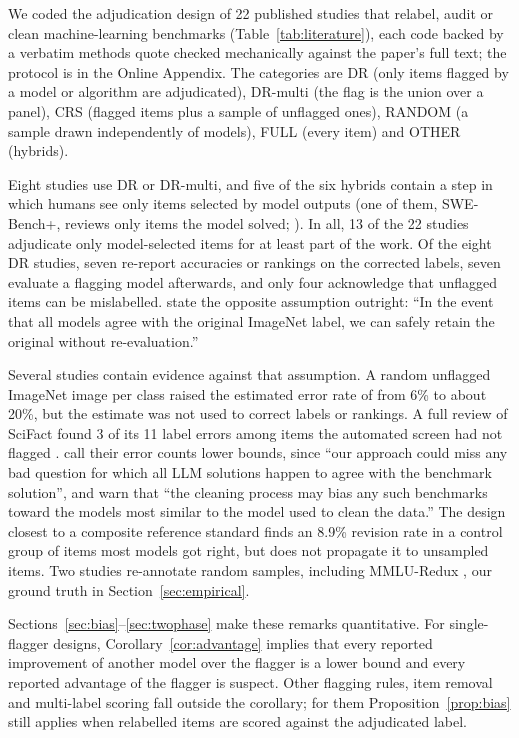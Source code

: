We coded the adjudication design of 22 published studies that relabel, audit or clean machine-learning benchmarks (Table~\ref{tab:literature}), each code backed by a verbatim methods quote checked mechanically against the paper's full text; the protocol is in the Online Appendix. The categories are DR (only items flagged by a model or algorithm are adjudicated), DR-multi (the flag is the union over a panel), CRS (flagged items plus a sample of unflagged ones), RANDOM (a sample drawn independently of models), FULL (every item) and OTHER (hybrids).

Eight studies use DR or DR-multi, and five of the six hybrids contain a step in which humans see only items selected by model outputs (one of them, SWE-Bench+, reviews only items the model solved; \citealp{aleithan2024swebench}). In all, 13 of the 22 studies adjudicate only model-selected items for at least part of the work. Of the eight DR studies, seven re-report accuracies or rankings on the corrected labels, seven evaluate a flagging model afterwards, and only four acknowledge that unflagged items can be mislabelled. \citet[p.~4]{beyer2020are} state the opposite assumption outright: ``In the event that all models agree with the original ImageNet label, we can safely retain the original without re-evaluation.''

Several studies contain evidence against that assumption. A random unflagged ImageNet image per class raised the estimated error rate of \citet{northcutt2021pervasive} from 6\% to about 20\%, but the estimate was not used to correct labels or rankings. A full review of SciFact found 3 of its 11 label errors among items the automated screen had not flagged \citep{sylvestre2026gold}. \citet{vendrow2025do} call their error counts lower bounds, since ``our approach could miss any bad question for which all LLM solutions happen to agree with the benchmark solution'', and \citet{chong2022detecting} warn that ``the cleaning process may bias any such benchmarks toward the models most similar to the model used to clean the data.'' The design closest to a composite reference standard \citep{alt2020tacred} finds an 8.9\% revision rate in a control group of items most models got right, but does not propagate it to unsampled items. Two studies re-annotate random samples, including MMLU-Redux \citep{gema2025are}, our ground truth in Section~\ref{sec:empirical}.

Sections~\ref{sec:bias}--\ref{sec:twophase} make these remarks quantitative. For single-flagger designs, Corollary~\ref{cor:advantage} implies that every reported improvement of another model over the flagger is a lower bound and every reported advantage of the flagger is suspect. Other flagging rules, item removal and multi-label scoring fall outside the corollary; for them Proposition~\ref{prop:bias} still applies when relabelled items are scored against the adjudicated label.

